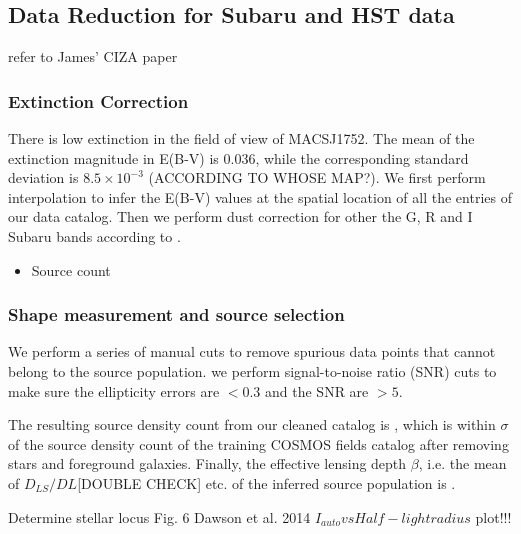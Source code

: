 \documentclass[letterpaper,useAMS,usenatbib]{mn2e}
\begin{document}
\subsection{Data Reduction for Subaru and HST data}
refer to James' CIZA paper

\subsubsection{Extinction Correction}
There is low extinction in the field of view of MACSJ1752. The mean of the extinction
magnitude in E(B-V) is 0.036, while the corresponding standard deviation 
is $8.5 \times 10^{-3}$ (ACCORDING TO WHOSE MAP?).
We first perform interpolation to infer the E(B-V) values at the spatial
location of all the entries of our data catalog. Then we perform dust
correction for other the G, R and I Subaru bands according to \cite{Schlafly2010}.

\begin{itemize}
\item Source count
\end{itemize}


\subsubsection{Shape measurement and source selection}
We perform a series of manual cuts to remove spurious data points that cannot 
belong to the source population.
we perform signal-to-noise ratio (SNR) cuts to make sure the ellipticity errors are $< 0.3$ 
and the SNR are $>5$.

The resulting source density count from our cleaned catalog is , which is
within $\sigma$ of the source density count of the training COSMOS fields
catalog after removing stars and foreground galaxies.  
Finally, the effective lensing depth $\beta$, i.e. the mean of $D_{LS} / D{L}$[DOUBLE
CHECK] etc. of the inferred source population is .  


Determine stellar locus
Fig. 6 Dawson et al. 2014 $I_{auto} vs Half-light radius$ plot!!!
\end{document}
